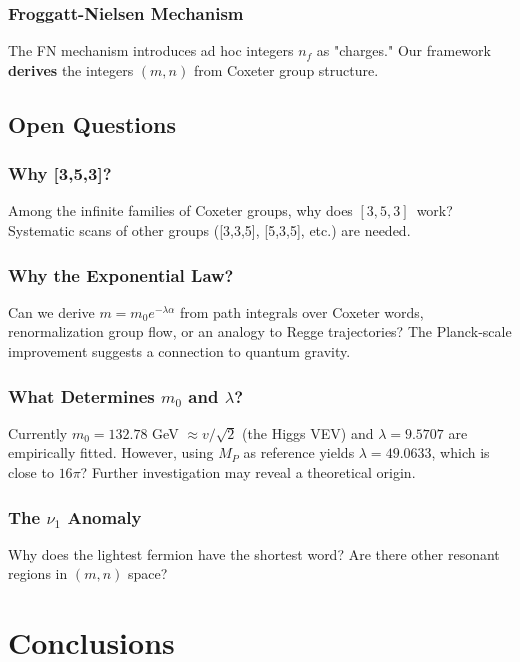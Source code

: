 \documentclass[11pt,a4paper]{article}
\newcommand{\tgrp}{\ensuremath{[3,5,3]}}
\begin{document}
\subsubsection{Froggatt-Nielsen Mechanism}

The FN mechanism \cite{FroggattNielsen1979} introduces ad hoc integers $n_f$ as "charges." Our framework \textbf{derives} the integers $(m,n)$ from Coxeter group structure.

\subsection{Open Questions}

\subsubsection{Why [3,5,3]?}

Among the infinite families of Coxeter groups, why does \tgrp\ work? Systematic scans of other groups ([3,3,5], [5,3,5], etc.) are needed.

\subsubsection{Why the Exponential Law?}

Can we derive $m = m_0 e^{-\lambda \alpha}$ from path integrals over Coxeter words, renormalization group flow, or an analogy to Regge trajectories? The Planck‑scale improvement suggests a connection to quantum gravity.

\subsubsection{What Determines $m_0$ and $\lambda$?}

Currently $m_0 = 132.78$ GeV $\approx v/\sqrt{2}$ (the Higgs VEV) and $\lambda = 9.5707$ are empirically fitted. However, using $M_P$ as reference yields $\lambda = 49.0633$, which is close to $16\pi$? Further investigation may reveal a theoretical origin.

\subsubsection{The $\nu_1$ Anomaly}

Why does the lightest fermion have the shortest word? Are there other resonant regions in $(m,n)$ space?

\section{Conclusions}
\end{document}
